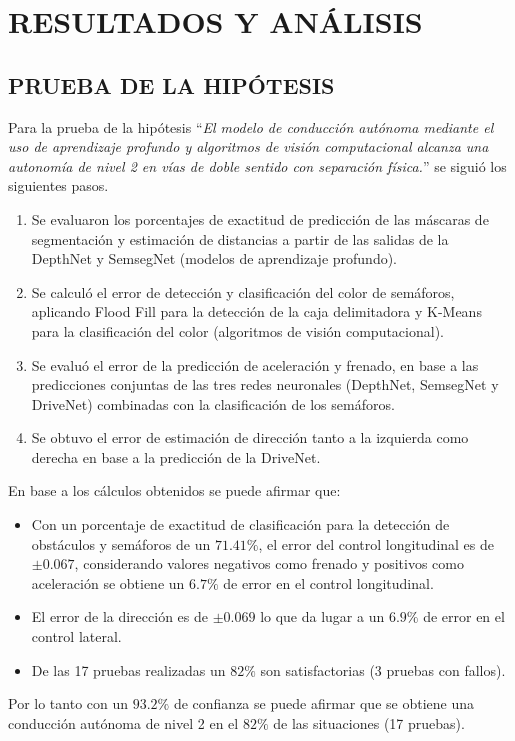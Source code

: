 \chapter{RESULTADOS Y ANÁLISIS}
	\negspacesec
	
	
	\pospacesec
	
	
	
	
	\section{PRUEBA DE LA HIPÓTESIS}
	
	Para la prueba de la hipótesis ``\textit{El modelo de conducción autónoma mediante el uso de aprendizaje profundo y algoritmos de visión computacional alcanza una autonomía de nivel 2 en vías de doble sentido con separación física.}'' se siguió los siguientes pasos.
	
	\begin{enumerate}[nosep]
		\item Se evaluaron los porcentajes de exactitud de predicción de las máscaras de segmentación y estimación de distancias a partir de las salidas de la DepthNet y SemsegNet (modelos de aprendizaje profundo).
		\item Se calculó el error de detección y clasificación del color de semáforos, aplicando Flood Fill para la detección de la caja delimitadora y K-Means para la clasificación del color (algoritmos de visión computacional).
		\item Se evaluó el error de la predicción de aceleración y frenado, en base a las predicciones conjuntas de las tres redes neuronales (DepthNet, SemsegNet y DriveNet) combinadas con la clasificación de los semáforos.
		\item Se obtuvo el error de estimación de dirección tanto a la izquierda como derecha en base a la predicción de la DriveNet.
	\end{enumerate}
	
	En base a los cálculos obtenidos se puede afirmar que:
	
	\begin{itemize}[nosep]
		\item Con un porcentaje de exactitud de clasificación para la detección de obstáculos y semáforos de un $71.41\%$, el error del control longitudinal es de $\pm 0.067$, considerando valores negativos como frenado y positivos como aceleración se obtiene un $6.7\%$ de error en el control longitudinal.
		\item El error de la dirección es de $\pm0.069$ lo que da lugar a un $6.9\%$ de error en el control lateral.
		\item De las 17 pruebas realizadas un $82\%$ son satisfactorias (3 pruebas con fallos).
	\end{itemize}

	Por lo tanto con un $93.2\%$ de confianza se puede afirmar que se obtiene una conducción autónoma de nivel 2 en el $82\%$ de las situaciones (17 pruebas).
		